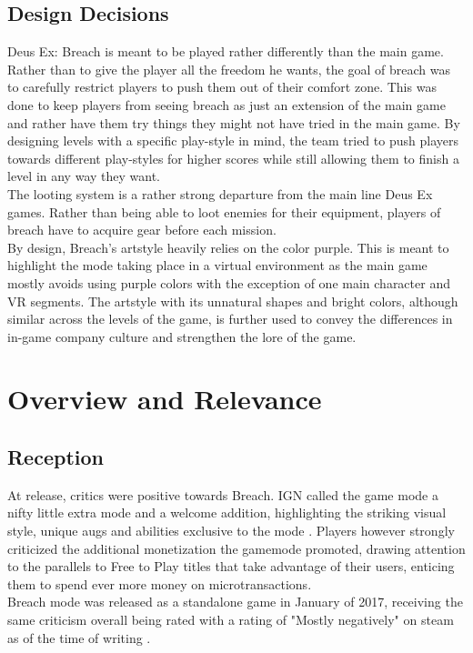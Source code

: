 \documentclass[a4paper]{article}
\begin{document}
\subsection{Design Decisions}
Deus Ex: Breach is meant to be played rather differently than the main game. Rather than to give the player all the freedom he wants, the goal of breach was to carefully restrict players to push them out of their comfort zone. This was done to keep players from seeing breach as just an extension of the main game and rather have them try things they might not have tried in the main game. By designing levels with a specific play-style in mind, the team tried to push players towards different play-styles for higher scores while still allowing them to finish a level in any way they want. \\
The looting system is a rather strong departure from the main line Deus Ex games. Rather than being able to loot enemies for their equipment, players of breach have to acquire gear before each mission.\\
By design, Breach's artstyle heavily relies on the color purple. This is meant to highlight the mode taking place in a virtual environment as the main game mostly avoids using purple colors with the exception of one main character and VR segments. The artstyle with its unnatural shapes and bright colors, although similar across the levels of the game, is further used to convey the differences in in-game company culture and strengthen the lore of the game. 


\section{Overview and Relevance}

\subsection{Reception}
At release, critics were positive towards Breach. IGN called the game mode a nifty little extra mode and a welcome addition, highlighting the striking visual style, unique augs and abilities exclusive to the mode \cite{ign}. Players however strongly criticized the additional monetization the gamemode promoted, drawing attention to the parallels to Free to Play titles that take advantage of their users, enticing them to spend ever more money on microtransactions.\\
Breach mode was released as a standalone game in January of 2017, receiving the same criticism overall being rated with a rating of "Mostly negatively" on steam as of the time of writing \cite{steam}.
\end{document}
